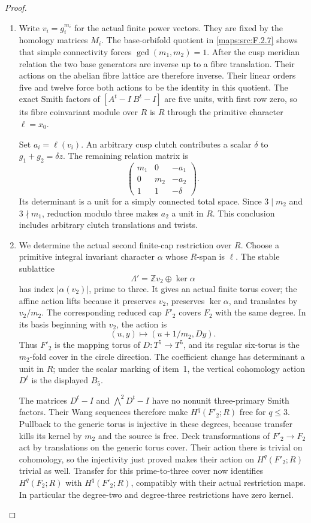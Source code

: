 \begin{proof}
\begin{enumerate}[label=\arabic*.]
\item Write $v_i=g_i^{m_i}$ for the actual finite power vectors.
They are fixed by the homology matrices $M_i$.
The base-orbifold quotient in \cref{maps:src:F.2.7} shows that
simple connectivity forces $\gcd(m_1,m_2)=1$.
After the cusp meridian relation the two base generators are
inverse up to a fibre translation.  Their actions on the abelian
fibre lattice are therefore inverse.  Their linear orders five
and twelve force both actions to be the identity in this quotient.
The exact Smith factors of $[A^t-I\ B^t-I]$ are five units,
with first row zero, so its fibre coinvariant module over $R$
is $R$ through the primitive character $\ell=x_0$.

Set $a_i=\ell(v_i)$.  An arbitrary cusp clutch contributes a scalar
$\delta$ to $g_1+g_2=\delta z$.  The remaining relation matrix is
\[
 \begin{pmatrix}m_1&0&-a_1\\0&m_2&-a_2\\1&1&-\delta\end{pmatrix}.
\]
Its determinant is a unit for a simply connected total space.
Since $3\mid m_2$ and $3\nmid m_1$, reduction modulo three makes
$a_2$ a unit in $R$.  This conclusion includes arbitrary clutch
translations and twists.

\item We determine the actual second finite-cap restriction over $R$.
Choose a primitive integral invariant character $\alpha$ whose
$R$-span is $\ell$.  The stable sublattice
\[
 \Lambda'=\mathbb Z v_2\oplus\ker\alpha
\]
has index $|\alpha(v_2)|$, prime to three.  It gives an actual
finite torus cover; the affine action lifts because it preserves
$v_2$, preserves $\ker\alpha$, and translates by $v_2/m_2$.
The corresponding reduced cap $F'_2$ covers $F_2$ with the same
degree.  In its basis beginning with $v_2$, the action is
\[
 (u,y)\longmapsto(u+1/m_2,Dy).
\]
Thus $F'_2$ is the mapping torus of $D:T^5\to T^5$, and its
regular six-torus is the $m_2$-fold cover in the circle direction.
The coefficient change has determinant a unit in $R$; under the
scalar marking of item~1, the vertical cohomology action $D^t$
is the displayed $B_5$.

The matrices $D^t-I$ and $\bigwedge^2D^t-I$ have no nonunit
three-primary Smith factors.  Their Wang sequences therefore make
$H^q(F'_2;R)$ free for $q\leq3$.  Pullback to the generic torus
is injective in these degrees, because transfer kills its kernel
by $m_2$ and the source is free.  Deck transformations of
$F'_2\to F_2$ act by translations on the generic torus cover.
Their action there is trivial on cohomology, so the injectivity
just proved makes their action on $H^q(F'_2;R)$ trivial as well.
Transfer for this prime-to-three cover now identifies
$H^q(F_2;R)$ with $H^q(F'_2;R)$, compatibly with their actual
restriction maps.  In particular the degree-two and degree-three
restrictions have zero kernel.


\end{enumerate}
\end{proof}
